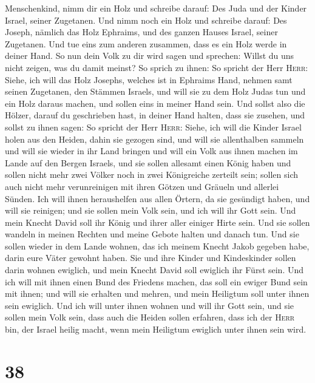 Menschenkind, nimm dir ein Holz und schreibe darauf: Des Juda und der
Kinder Israel, seiner Zugetanen. Und nimm noch ein Holz und schreibe
darauf: Des Joseph, nämlich das Holz Ephraims, und des ganzen Hauses
Israel, seiner Zugetanen.  Und tue eins zum anderen
zusammen, dass es ein Holz werde in deiner Hand.  So nun
dein Volk zu dir wird sagen und sprechen: Willst du uns nicht zeigen,
was du damit meinst?  So sprich zu ihnen: So spricht der
Herr \textsc{Herr}: Siehe, ich will das Holz Josephs, welches ist in
Ephraims Hand, nehmen samt seinen Zugetanen, den Stämmen Israels, und
will sie zu dem Holz Judas tun und ein Holz daraus machen, und sollen
eins in meiner Hand sein.  Und sollst also die Hölzer,
darauf du geschrieben hast, in deiner Hand halten, dass sie zusehen,
 und sollst zu ihnen sagen: So spricht der Herr
\textsc{Herr}: Siehe, ich will die Kinder Israel holen aus den Heiden,
dahin sie gezogen sind, und will sie allenthalben sammeln und will sie
wieder in ihr Land bringen  und will ein Volk aus ihnen
machen im Lande auf den Bergen Israels, und sie sollen allesamt einen
König haben und sollen nicht mehr zwei Völker noch in zwei Königreiche
zerteilt sein;  sollen sich auch nicht mehr verunreinigen
mit ihren Götzen und Gräueln und allerlei Sünden. Ich will ihnen
heraushelfen aus allen Örtern, da sie gesündigt haben, und will sie
reinigen; und sie sollen mein Volk sein, und ich will ihr Gott sein.
 Und mein Knecht David soll ihr König und ihrer aller
einiger Hirte sein. Und sie sollen wandeln in meinen Rechten und meine
Gebote halten und danach tun.  Und sie sollen wieder in
dem Lande wohnen, das ich meinem Knecht Jakob gegeben habe, darin eure
Väter gewohnt haben. Sie und ihre Kinder und Kindeskinder sollen darin
wohnen ewiglich, und mein Knecht David soll ewiglich ihr Fürst sein.
 Und ich will mit ihnen einen Bund des Friedens machen,
das soll ein ewiger Bund sein mit ihnen; und will sie erhalten und
mehren, und mein Heiligtum soll unter ihnen sein ewiglich.
 Und ich will unter ihnen wohnen und will ihr Gott sein,
und sie sollen mein Volk sein,  dass auch die Heiden
sollen erfahren, dass ich der \textsc{Herr} bin, der Israel heilig
macht, wenn mein Heiligtum ewiglich unter ihnen sein wird.

\hypertarget{section-37}{%
\section{38}\label{section-37}}

